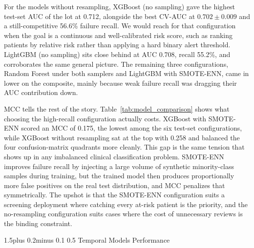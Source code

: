\documentclass[12pt]{article}
\makeatletter
\renewcommand{\_}{\textunderscore\allowbreak}
\renewcommand{\subsection}{\@startsection{subsection}{2}{0pt}%
  {1.5\baselineskip plus 0.2\baselineskip minus 0.1\baselineskip}%
  {0.5\baselineskip}%
  {\bfseries\normalsize}}
\makeatother
\begin{document}
For the models without resampling, XGBoost (no sampling) gave the highest test-set AUC of the lot at 0.712, alongside the best CV-AUC at $0.702 \pm 0.009$ and a still-competitive 56.6\% failure recall. We would reach for that configuration when the goal is a continuous and well-calibrated risk score, such as ranking patients by relative risk rather than applying a hard binary alert threshold. LightGBM (no sampling) sits close behind at AUC 0.708, recall 55.2\%, and corroborates the same general picture. The remaining three configurations, Random Forest under both samplers and LightGBM with SMOTE-ENN, came in lower on the composite, mainly because weak failure recall was dragging their AUC contribution down.

MCC tells the rest of the story. Table~\ref{tab:model_comparison} shows what choosing the high-recall configuration actually costs. XGBoost with SMOTE-ENN scored an MCC of 0.175, the lowest among the six test-set configurations, while XGBoost without resampling sat at the top with 0.258 and balanced the four confusion-matrix quadrants more cleanly. This gap is the same tension that shows up in any imbalanced clinical classification problem. SMOTE-ENN improves failure recall by injecting a large volume of synthetic minority-class samples during training, but the trained model then produces proportionally more false positives on the real test distribution, and MCC penalizes that symmetrically. The upshot is that the SMOTE-ENN configuration suits a screening deployment where catching every at-risk patient is the priority, and the no-resampling configuration suits cases where the cost of unnecessary reviews is the binding constraint.

\FloatBarrier
\subsection{Temporal Models Performance}
\end{document}
